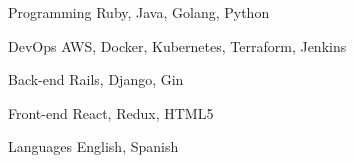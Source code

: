 

\begin{cvskills}
  \cvskill
    {Programming} %
    {Ruby, Java, Golang, Python} %

  \cvskill
    {DevOps} %
    {AWS, Docker, Kubernetes, Terraform, Jenkins} %

  \cvskill
    {Back-end} %
    {Rails, Django, Gin} %

  \cvskill
    {Front-end} %
    {React, Redux, HTML5} %

  \cvskill
    {Languages} %
    {English, Spanish} %

\end{cvskills}